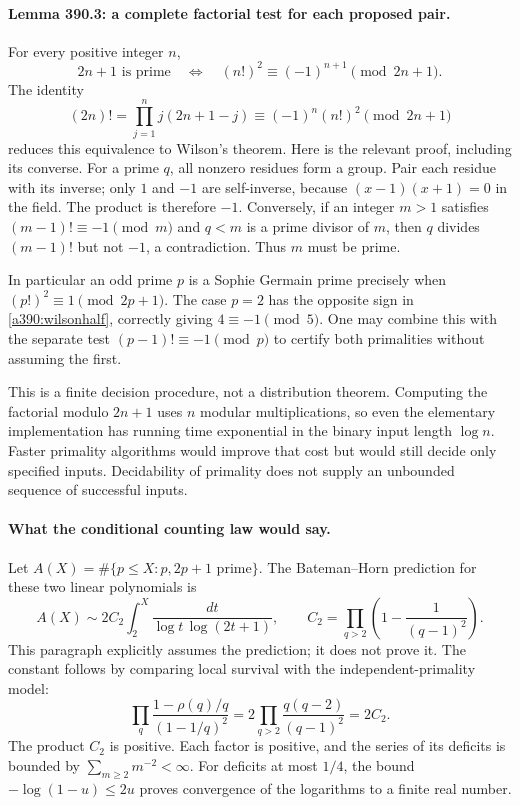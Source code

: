 \documentclass[11pt]{article}
\begin{document}
\paragraph{Lemma 390.3: a complete factorial test for each proposed pair.}
For every positive integer $n$,
\begin{equation}\label{a390:wilsonhalf}
 2n+1\text{ is prime}\quad\Longleftrightarrow\quad
                    (n!)^2\equiv(-1)^{n+1}\pmod{2n+1}.
\end{equation}
The identity
\[
 (2n)!=\prod_{j=1}^n j(2n+1-j)
                   \equiv(-1)^n(n!)^2\pmod{2n+1}
\]
reduces this equivalence to Wilson's theorem. Here is the relevant proof, including its converse. For a prime $q$, all nonzero residues form a group. Pair each residue with its inverse; only $1$ and $-1$ are self-inverse, because $(x-1)(x+1)=0$ in the field. The product is therefore $-1$. Conversely, if an integer $m>1$ satisfies $(m-1)!\equiv-1\pmod m$ and $q<m$ is a prime divisor of $m$, then $q$ divides $(m-1)!$ but not $-1$, a contradiction. Thus $m$ must be prime.

In particular an odd prime $p$ is a Sophie Germain prime precisely when $(p!)^2\equiv1\pmod{2p+1}$. The case $p=2$ has the opposite sign in \eqref{a390:wilsonhalf}, correctly giving $4\equiv-1\pmod5$. One may combine this with the separate test $(p-1)!\equiv-1\pmod p$ to certify both primalities without assuming the first.

This is a finite decision procedure, not a distribution theorem. Computing the factorial modulo $2n+1$ uses $n$ modular multiplications, so even the elementary implementation has running time exponential in the binary input length $\log n$. Faster primality algorithms would improve that cost but would still decide only specified inputs. Decidability of primality does not supply an unbounded sequence of successful inputs.

\paragraph{What the conditional counting law would say.}
Let $A(X)=\#\{p\leq X:p,2p+1\text{ prime}\}$. The Bateman--Horn prediction for these two linear polynomials is
\begin{equation}\label{a390:conditional}
 A(X)\sim 2C_2\int_2^X\frac{dt}{\log t\,\log(2t+1)},
 \qquad C_2=\prod_{q>2}\left(1-\frac1{(q-1)^2}\right).
\end{equation}
This paragraph explicitly assumes the prediction; it does not prove it. The constant follows by comparing local survival with the independent-primality model:
\[
 \prod_q\frac{1-\rho(q)/q}{(1-1/q)^2}
     =2\prod_{q>2}\frac{q(q-2)}{(q-1)^2}=2C_2.
\]
The product $C_2$ is positive. Each factor is positive, and the series of its deficits is bounded by $\sum_{m\geq2}m^{-2}<\infty$. For deficits at most $1/4$, the bound $-\log(1-u)\leq2u$ proves convergence of the logarithms to a finite real number.
\end{document}
